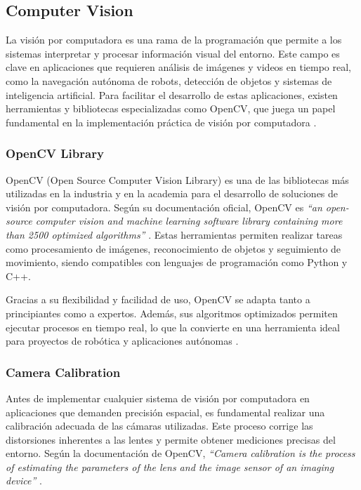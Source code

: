 \subsection{Computer Vision}

    La visión por computadora es una rama de la programación que permite a los sistemas interpretar y procesar información visual del entorno. Este campo es clave en aplicaciones que requieren análisis de imágenes y videos en tiempo real, como la navegación autónoma de robots, detección de objetos y sistemas de inteligencia artificial. Para facilitar el desarrollo de estas aplicaciones, existen herramientas y bibliotecas especializadas como OpenCV, que juega un papel fundamental en la implementación práctica de visión por computadora \cite{opencv_docs}.  
    
    \subsubsection{OpenCV Library}
    
    OpenCV (Open Source Computer Vision Library) es una de las bibliotecas más utilizadas en la industria y en la academia para el desarrollo de soluciones de visión por computadora. Según su documentación oficial, OpenCV es \textit{“an open-source computer vision and machine learning software library containing more than 2500 optimized algorithms”} \cite{opencv_docs}. Estas herramientas permiten realizar tareas como procesamiento de imágenes, reconocimiento de objetos y seguimiento de movimiento, siendo compatibles con lenguajes de programación como Python y C++.  
    
    Gracias a su flexibilidad y facilidad de uso, OpenCV se adapta tanto a principiantes como a expertos. Además, sus algoritmos optimizados permiten ejecutar procesos en tiempo real, lo que la convierte en una herramienta ideal para proyectos de robótica y aplicaciones autónomas \cite{opencv_docs}.  
    
    \subsubsection{Camera Calibration}
    
    Antes de implementar cualquier sistema de visión por computadora en aplicaciones que demanden precisión espacial, es fundamental realizar una calibración adecuada de las cámaras utilizadas. Este proceso corrige las distorsiones inherentes a las lentes y permite obtener mediciones precisas del entorno. Según la documentación de OpenCV, \textit{“Camera calibration is the process of estimating the parameters of the lens and the image sensor of an imaging device”} \cite{opencv_calib3d}.  
    
